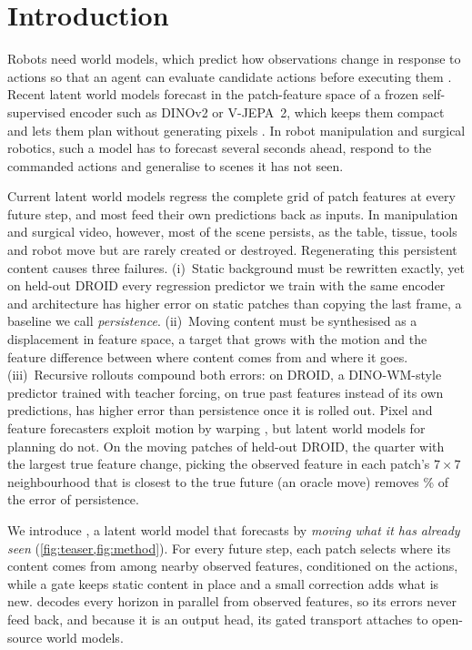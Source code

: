 \section{Introduction}
\label{sec:intro}

Robots need world models, which predict how observations change in response to actions so that an agent can
evaluate candidate actions before executing them \citep{hafner2019planet}.
%
Recent latent world models forecast in the patch-feature space of a frozen self-supervised encoder such as DINOv2 or
V-JEPA~2, which keeps them compact and lets them plan without generating pixels
\citep{zhou2025dinowm,assran2025vjepa2,maes2026lewm,sobal2025pldm}.
%
In robot manipulation and surgical robotics, such a model has to forecast several seconds ahead, respond to the
commanded actions and generalise to scenes it has not seen.

Current latent world models regress the complete grid of patch features at every future step, and most feed their own
predictions back as inputs.
%
In manipulation and surgical video, however, most of the scene persists, as the table, tissue, tools and robot move but
are rarely created or destroyed.
%
Regenerating this persistent content causes three failures.
%
(i)~Static background must be rewritten exactly, yet on held-out DROID every regression predictor we train with the same
encoder and architecture has higher error on static patches than copying the last frame, a baseline we call
\emph{persistence}.
%
(ii)~Moving content must be synthesised as a displacement in feature space, a target that grows with the motion and
the feature difference between where content comes from and where it goes.
%
(iii)~Recursive rollouts compound both errors: on DROID, a DINO-WM-style predictor trained with teacher forcing, on
true past features instead of its own predictions, has higher error than persistence once it is rolled out.
%
Pixel and feature forecasters exploit motion by warping \citep{finn2016advection,liu2017voxelflow,saric2020warp}, but
latent world models for planning do not.
%
On the moving patches of held-out DROID, the quarter with the largest true feature change, picking the observed
feature in each patch's $7{\times}7$ neighbourhood that is closest to the true future (an oracle move) removes
\geoOracleRed\% of the error of persistence.

We introduce \ours{}, a latent world model that forecasts by \emph{moving what it has already seen}
(\cref{fig:teaser,fig:method}).
%
For every future step, each patch selects where its content comes from among nearby observed features, conditioned on
the actions, while a gate keeps static content in place and a small correction adds what is new.
%
\ours{} decodes every horizon in parallel from observed features, so its errors never feed back, and because it is an
output head, its gated transport attaches to open-source world models.

